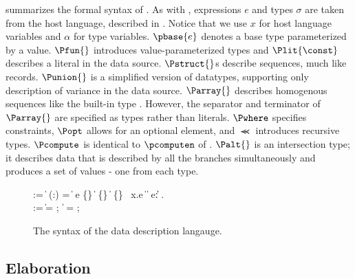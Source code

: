  summarizes the formal syntax of \ipads.  As
with \ddc, expressions $e$ and types $\sigma$ are taken from the host
language, described in .  Notice that we use $x$
for host language variables and $\alpha$ for \ipads{} type variables.
$\pbase{e}$ denotes a base type parameterized by a value. $\Pfun{}$
introduces value-parameterized types and $\Plit{\const}$ describes a
literal in the data source. $\Pstruct{}$s describe sequences, much
like \padsml{} records.  $\Punion{}$ is a simplified version of
\padsml{} datatypes, supporting only description of variance in the
data source.  $\Parray{}$ describes homogenous sequences like the
\padsml{} built-in type . However, the separator and
terminator of $\Parray{}$ are specified as types rather than literals.
$\Pwhere$ specifies constraints, $\Popt$ allows for an optional
element, and $\Prec$ introduces recursive types. $\Pcompute$ is
identical to $\pcomputen$ of \ddc.  $\Palt{}$ is an intersection type;
it describes data that is described by all the branches simultaneously
and produces a set of values - one from each type.

\begin{figure}
\begin{bnf}
   \meta{\itmv} \::= 
     \| \Plit{\const} \nlalt
    \Pfun{} (\var:\ity) = \itmv \| \itmv\; e \nlalt
    \Pstruct{} \{\overrightarrow {\var{:}\itmv}\} \| 
    \Punion{} \{\overrightarrow {\var{:}\itmv}\} \|
    \Palt{} \{\overrightarrow {\var{:}\itmv}\} \nlalt
    \itmv \; \Pwhere{} \, x.e \| 
    \Popt{}\; \itmv \|
    \iParray{\itmv}{\itmv}{\itmv}{} \nlalt 
    \Pcompute{} \; e{:}\ity \|
     \alpha \| \Prec{} \; \alpha . \itmv
     \\
    \::= \itmv \| \alpha = \itmv;\, \|
  \Prec{} \; \alpha = \itmv;\,
\end{bnf}
\caption{The syntax of the \ipads{} data description langauge.}
\label{fig:ipads-syntax}
\end{figure}

\subsection{\ipads{} Elaboration}
\label{sec:trans-sl}

